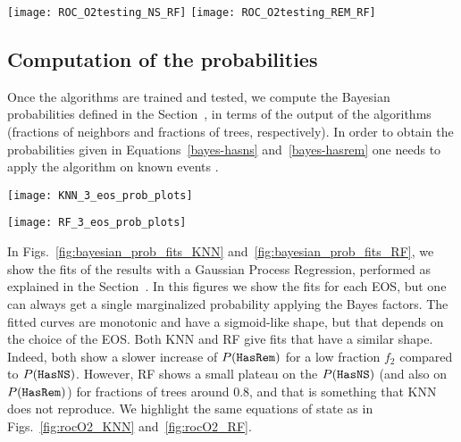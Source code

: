 \begin{figure*}%
\texttt{[image: ROC\_O2testing\_NS\_RF]}
\texttt{[image: ROC\_O2testing\_REM\_RF]}
\caption{ROC curves for the testing dataset for \ac{RF} classfier. All 23 EoS shown in grey, in color the EoSs with minimum and maximum mass, along commonly used SLy. }
\label{fig:rocO2_RF}
\end{figure*}


\subsection{Computation of the probabilities}

Once the algorithms are trained and tested, we compute the Bayesian
probabilities defined in the Section~, in terms of the output of the algorithms (fractions of neighbors and fractions of trees, respectively). In order to obtain the probabilities given in Equations~\ref{bayes-hasns} and~\ref{bayes-hasrem} one needs to apply the algorithm on known events . 

\begin{figure*}%
\texttt{[image: KNN\_3\_eos\_prob\_plots]}
\caption{.}
\label{fig:bayesian_prob_fits_KNN}
\end{figure*}

\begin{figure*}%
\texttt{[image: RF\_3\_eos\_prob\_plots]}
\caption{}
\label{fig:bayesian_prob_fits_RF}
\end{figure*}

In Figs.~\ref{fig:bayesian_prob_fits_KNN} and~\ref{fig:bayesian_prob_fits_RF}, 
we show the fits of  the results with a Gaussian Process Regression,
performed as explained in the Section~. In this figures we show
the fits for each EOS, but one can always get a single marginalized probability
applying the Bayes factors. The fitted curves are monotonic and have a
sigmoid-like shape, but that depends on the choice of the EOS. Both \ac{KNN}
and \ac{RF} give fits that have a similar shape. Indeed, both show a slower
increase of $P({{\tt HasRem}})$ for a low fraction $f_2$ compared to $P({{\tt HasNS}})$.
However, \ac{RF} shows a small plateau on the $P({{\tt HasNS}})$ (and also on
$P({{\tt HasRem}})$) for fractions of trees around $0.8$, and that is something that
\ac{KNN} does not reproduce. We highlight the same equations of state as in
Figs.~\ref{fig:rocO2_KNN} and~\ref{fig:rocO2_RF}.

